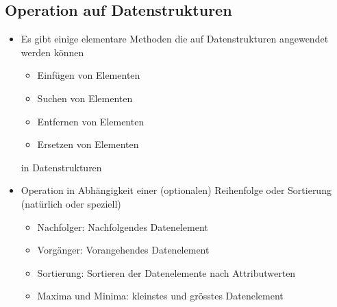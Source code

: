 \subsection{Operation auf Datenstrukturen}
\begin{itemize}[noitemsep,topsep=0pt,leftmargin=*]
    \item Es gibt einige elementare Methoden die auf Datenstrukturen angewendet werden können
    \begin{itemize}[noitemsep,topsep=0pt,leftmargin=*]
        \item Einfügen von Elementen
        \item Suchen von Elementen
        \item Entfernen von Elementen
        \item Ersetzen von Elementen
    \end{itemize}
in Datenstrukturen
    \item Operation in Abhängigkeit einer (optionalen) Reihenfolge oder Sortierung (natürlich oder speziell)
    \begin{itemize}[noitemsep,topsep=0pt,leftmargin=*]
        \item Nachfolger: Nachfolgendes Datenelement
        \item Vorgänger: Vorangehendes Datenelement
        \item Sortierung: Sortieren der Datenelemente nach Attributwerten
        \item Maxima und Minima: kleinstes und grösstes Datenelement
    \end{itemize}
\end{itemize}


